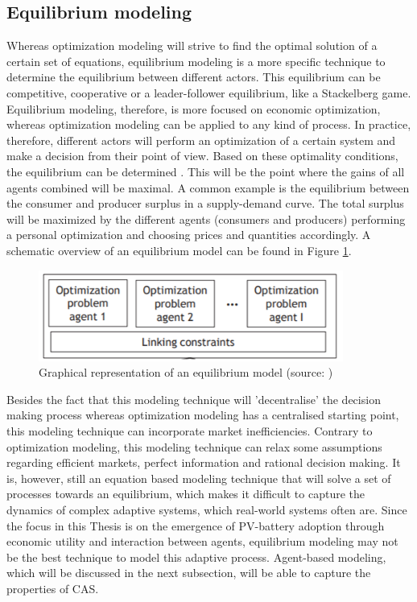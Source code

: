 \subsection{\large{Equilibrium modeling}}
Whereas optimization modeling will strive to find the optimal solution of a certain set of equations, equilibrium modeling is a more specific technique to determine the equilibrium between different actors. This equilibrium can be competitive, cooperative or a leader-follower equilibrium, like a Stackelberg game. Equilibrium modeling, therefore, is more focused on economic optimization, whereas optimization modeling can be applied to any kind of process. In practice, therefore, different actors will perform an optimization of a certain system and make a decision from their point of view. Based on these optimality conditions, the equilibrium can be determined \cite{Poncelet}. This will be the point where the gains of all agents combined will be maximal. A common example is the equilibrium between the consumer and producer surplus in a supply-demand curve. The total surplus will be maximized by the different agents (consumers and producers) performing a personal optimization and choosing prices and quantities accordingly. A schematic overview of an equilibrium model can be found in Figure \ref{Figure:equi}. 
\begin{figure}[h!]
\centering
\includegraphics[width=10cm]{Equilibrium.PNG}
\caption[Graphical representation of an equilibrium model]{Graphical representation of an equilibrium model (source: \cite{Poncelet})}
\label{Figure:equi}
\end{figure}
\noindent
Besides the fact that this modeling technique will 'decentralise' the decision making process whereas optimization modeling has a centralised starting point, this modeling technique can incorporate market inefficiencies. Contrary to optimization modeling, this modeling technique can relax some assumptions regarding efficient markets, perfect information and rational decision making. It is, however, still an equation based modeling technique that will solve a set of processes towards an equilibrium, which makes it difficult to capture the dynamics of complex adaptive systems, which real-world systems often are. Since the focus in this Thesis is on the emergence of PV-battery adoption through economic utility and interaction between agents, equilibrium modeling may not be the best technique to model this adaptive process. Agent-based modeling, which will be discussed in the next subsection, will be able to capture the properties of CAS. 
